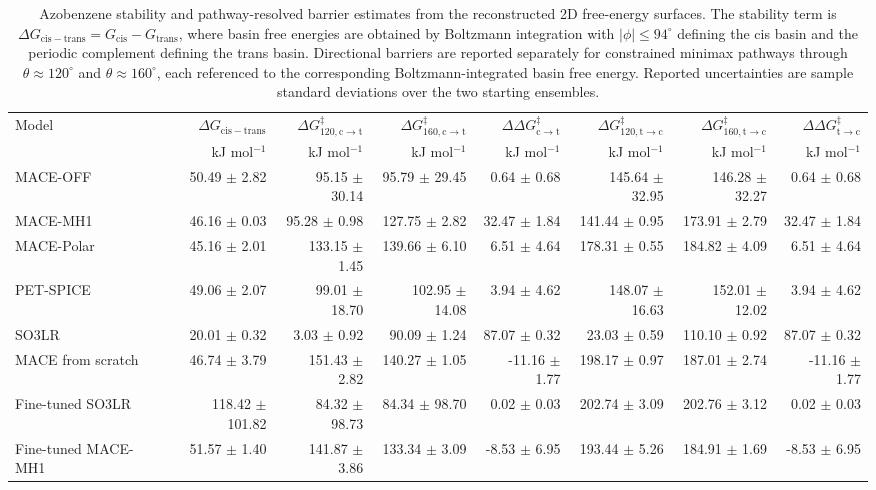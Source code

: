 \begin{table}
\centering
\caption{Azobenzene stability and pathway-resolved barrier estimates from the reconstructed 2D free-energy surfaces. The stability term is $\Delta G_{\mathrm{cis-trans}}=G_{\mathrm{cis}}-G_{\mathrm{trans}}$, where basin free energies are obtained by Boltzmann integration with $|\phi|\leq94^\circ$ defining the cis basin and the periodic complement defining the trans basin. Directional barriers are reported separately for constrained minimax pathways through $\theta\approx120^\circ$ and $\theta\approx160^\circ$, each referenced to the corresponding Boltzmann-integrated basin free energy. Reported uncertainties are sample standard deviations over the two starting ensembles.}
\begin{tabular}{lrrrrrrr}
\hline
Model & $\Delta G_{\mathrm{cis-trans}}$ & $\Delta G^\ddagger_{120,\mathrm{c\to t}}$ & $\Delta G^\ddagger_{160,\mathrm{c\to t}}$ & $\Delta\Delta G^\ddagger_{\mathrm{c\to t}}$ & $\Delta G^\ddagger_{120,\mathrm{t\to c}}$ & $\Delta G^\ddagger_{160,\mathrm{t\to c}}$ & $\Delta\Delta G^\ddagger_{\mathrm{t\to c}}$ \\
 & kJ mol$^{-1}$ & kJ mol$^{-1}$ & kJ mol$^{-1}$ & kJ mol$^{-1}$ & kJ mol$^{-1}$ & kJ mol$^{-1}$ & kJ mol$^{-1}$ \\
\hline
MACE-OFF & 50.49 $\pm$ 2.82 & 95.15 $\pm$ 30.14 & 95.79 $\pm$ 29.45 & 0.64 $\pm$ 0.68 & 145.64 $\pm$ 32.95 & 146.28 $\pm$ 32.27 & 0.64 $\pm$ 0.68 \\
MACE-MH1 & 46.16 $\pm$ 0.03 & 95.28 $\pm$ 0.98 & 127.75 $\pm$ 2.82 & 32.47 $\pm$ 1.84 & 141.44 $\pm$ 0.95 & 173.91 $\pm$ 2.79 & 32.47 $\pm$ 1.84 \\
MACE-Polar & 45.16 $\pm$ 2.01 & 133.15 $\pm$ 1.45 & 139.66 $\pm$ 6.10 & 6.51 $\pm$ 4.64 & 178.31 $\pm$ 0.55 & 184.82 $\pm$ 4.09 & 6.51 $\pm$ 4.64 \\
PET-SPICE & 49.06 $\pm$ 2.07 & 99.01 $\pm$ 18.70 & 102.95 $\pm$ 14.08 & 3.94 $\pm$ 4.62 & 148.07 $\pm$ 16.63 & 152.01 $\pm$ 12.02 & 3.94 $\pm$ 4.62 \\
SO3LR & 20.01 $\pm$ 0.32 & 3.03 $\pm$ 0.92 & 90.09 $\pm$ 1.24 & 87.07 $\pm$ 0.32 & 23.03 $\pm$ 0.59 & 110.10 $\pm$ 0.92 & 87.07 $\pm$ 0.32 \\
MACE from scratch & 46.74 $\pm$ 3.79 & 151.43 $\pm$ 2.82 & 140.27 $\pm$ 1.05 & -11.16 $\pm$ 1.77 & 198.17 $\pm$ 0.97 & 187.01 $\pm$ 2.74 & -11.16 $\pm$ 1.77 \\
Fine-tuned SO3LR & 118.42 $\pm$ 101.82 & 84.32 $\pm$ 98.73 & 84.34 $\pm$ 98.70 & 0.02 $\pm$ 0.03 & 202.74 $\pm$ 3.09 & 202.76 $\pm$ 3.12 & 0.02 $\pm$ 0.03 \\
Fine-tuned MACE-MH1 & 51.57 $\pm$ 1.40 & 141.87 $\pm$ 3.86 & 133.34 $\pm$ 3.09 & -8.53 $\pm$ 6.95 & 193.44 $\pm$ 5.26 & 184.91 $\pm$ 1.69 & -8.53 $\pm$ 6.95 \\
\hline
\end{tabular}
\end{table}
 